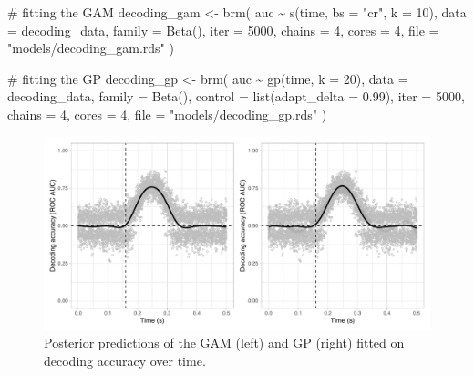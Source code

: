 \documentclass[
  doc,
  floatsintext,
  longtable,
  a4paper,
  nolmodern,
  notxfonts,
  notimes,
  colorlinks=true,linkcolor=blue,citecolor=blue,urlcolor=blue]{apa7}
\newenvironment{Shaded}{\begin{snugshade}}{\end{snugshade}}
\newcommand{\AttributeTok}[1]{\textcolor[rgb]{0.40,0.45,0.13}{#1}}
\newcommand{\CommentTok}[1]{\textcolor[rgb]{0.37,0.37,0.37}{#1}}
\newcommand{\DecValTok}[1]{\textcolor[rgb]{0.68,0.00,0.00}{#1}}
\newcommand{\FloatTok}[1]{\textcolor[rgb]{0.68,0.00,0.00}{#1}}
\newcommand{\FunctionTok}[1]{\textcolor[rgb]{0.28,0.35,0.67}{#1}}
\newcommand{\NormalTok}[1]{\textcolor[rgb]{0.00,0.23,0.31}{#1}}
\newcommand{\OtherTok}[1]{\textcolor[rgb]{0.00,0.23,0.31}{#1}}
\newcommand{\SpecialCharTok}[1]{\textcolor[rgb]{0.37,0.37,0.37}{#1}}
\newcommand{\StringTok}[1]{\textcolor[rgb]{0.13,0.47,0.30}{#1}}
\begin{document}
\begin{Shaded}
\begin{Highlighting}[]
\CommentTok{\# fitting the GAM}
\NormalTok{decoding\_gam }\OtherTok{\textless{}{-}} \FunctionTok{brm}\NormalTok{(}
\NormalTok{    auc }\SpecialCharTok{\textasciitilde{}} \FunctionTok{s}\NormalTok{(time, }\AttributeTok{bs =} \StringTok{"cr"}\NormalTok{, }\AttributeTok{k =} \DecValTok{10}\NormalTok{),}
    \AttributeTok{data =}\NormalTok{ decoding\_data,}
    \AttributeTok{family =} \FunctionTok{Beta}\NormalTok{(),}
    \AttributeTok{iter =} \DecValTok{5000}\NormalTok{,}
    \AttributeTok{chains =} \DecValTok{4}\NormalTok{,}
    \AttributeTok{cores =} \DecValTok{4}\NormalTok{,}
    \AttributeTok{file =} \StringTok{"models/decoding\_gam.rds"}
\NormalTok{    )}
\end{Highlighting}
\end{Shaded}

\begin{Shaded}
\begin{Highlighting}[]
\CommentTok{\# fitting the GP}
\NormalTok{decoding\_gp }\OtherTok{\textless{}{-}} \FunctionTok{brm}\NormalTok{(}
\NormalTok{    auc }\SpecialCharTok{\textasciitilde{}} \FunctionTok{gp}\NormalTok{(time, }\AttributeTok{k =} \DecValTok{20}\NormalTok{),}
    \AttributeTok{data =}\NormalTok{ decoding\_data,}
    \AttributeTok{family =} \FunctionTok{Beta}\NormalTok{(),}
    \AttributeTok{control =} \FunctionTok{list}\NormalTok{(}\AttributeTok{adapt\_delta =} \FloatTok{0.99}\NormalTok{),}
    \AttributeTok{iter =} \DecValTok{5000}\NormalTok{,}
    \AttributeTok{chains =} \DecValTok{4}\NormalTok{,}
    \AttributeTok{cores =} \DecValTok{4}\NormalTok{,}
    \AttributeTok{file =} \StringTok{"models/decoding\_gp.rds"}
\NormalTok{    )}
\end{Highlighting}
\end{Shaded}

\begin{figure}[H]

\caption{Posterior predictions of the GAM (left) and GP (right) fitted
on decoding accuracy over time.}

{\centering \includegraphics[width=1\textwidth,height=\textheight]{brms_meeg_files/figure-pdf/decoding-preds-1.pdf}

}

\end{figure}%
\end{document}
